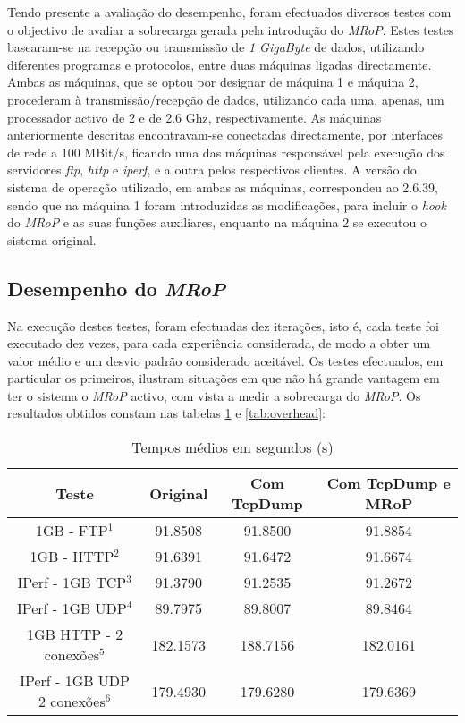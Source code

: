 Tendo presente a avaliação do desempenho, foram efectuados diversos testes com o objectivo de avaliar a sobrecarga gerada pela introdução do \textit{MRoP}.
Estes testes basearam-se na recepção ou transmissão de \textit{1 GigaByte} de dados, utilizando diferentes programas e protocolos, entre duas máquinas ligadas directamente.
Ambas as máquinas, que se optou por designar de máquina 1 e máquina 2, procederam à transmissão/recepção de dados, utilizando cada uma, apenas, um processador activo de 2 e de 2.6 Ghz, respectivamente.
As máquinas anteriormente descritas encontravam-se conectadas directamente, por interfaces de rede a 100 MBit/s, ficando uma das máquinas responsável pela execução dos servidores \textit{ftp}, \textit{http} e \textit{iperf}, e a outra pelos respectivos clientes.
A versão do sistema de operação utilizado, em ambas as máquinas, correspondeu ao 2.6.39, sendo que na máquina 1 foram introduzidas as modificações, para incluir o \textit{hook} do \textit{MRoP} e as suas funções auxiliares, enquanto na máquina 2 se executou o sistema original.

\subsection{Desempenho do \textit{MRoP}}


Na execução destes testes, foram efectuadas dez iterações, isto é, cada teste foi executado dez vezes, para cada experiência considerada, de modo a obter um valor médio e um desvio padrão considerado aceitável.
Os testes efectuados, em particular os primeiros, ilustram situações em que não há grande vantagem em ter o sistema o \textit{MRoP} activo, com vista a medir a sobrecarga do \textit{MRoP}.
Os resultados obtidos constam nas tabelas \ref{tab:desempenho} e \ref{tab:overhead}:

\begin{table}[!htb]
\begin{center}
\caption{Tempos médios em segundos (s)}
\begin{tabular}{ | c | c | c | c |  }
\hline
Teste & \hspace {0.3cm} Original \hspace {0.3cm}& \hspace {0.2cm} Com TcpDump \hspace {0.2cm} & Com TcpDump e MRoP \\
\hline
1GB - FTP$^{1}$ & 91.8508	& 91.8500 & 91.8854 \\
1GB - HTTP$^{2}$ & 91.6391 & 91.6472 & 91.6674 \\ 
IPerf - 1GB TCP$^{3}$ & 91.3790	& 91.2535	& 91.2672 \\
IPerf - 1GB UDP$^{4}$ & 89.7975 & 89.8007 & 89.8464 \\
\hline
\hline
1GB HTTP - 2 conexões$^{5}$ & 182.1573 & 188.7156 & 182.0161 \\
IPerf - 1GB UDP 2 conexões$^{6}$ & 179.4930 & 179.6280 & 179.6369 \\
\hline
\end{tabular}
\label{tab:desempenho}
\end{center}
\end{table}

